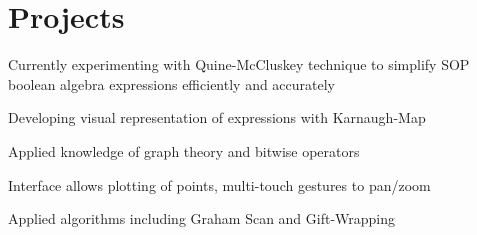 \documentclass[]{deedy-resume-openfont}
\begin{document}
\begin{minipage}[t]{0.66\textwidth}

\section{Projects}

\begin{tightemize}
\item Currently experimenting with Quine-McCluskey technique to simplify SOP boolean algebra expressions efficiently and accurately\\
\item Developing visual representation of expressions with Karnaugh-Map\\
\item Applied knowledge of graph theory and bitwise operators\\
\end{tightemize}
\sectionsep

\begin{tightemize}
\item Interface allows plotting of points, multi-touch gestures to pan/zoom\\
\item Applied algorithms including Graham Scan and Gift-Wrapping\\
\end{tightemize}
\sectionsep





\end{minipage}
\end{document}
